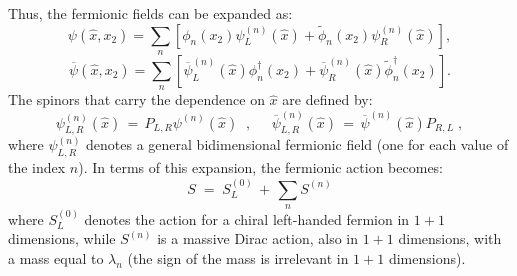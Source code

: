 \documentclass[a4paper,12pt]{article}
\begin{document}
{{Thus, the fermionic fields can be expanded as:
\begin{equation}
\psi (\hat x , x_2 ) = \sum_n [\phi_n(x_2) \psi_L^{(n)}(\hat x) +
\widetilde{\phi}_n(x_2) \psi_R^{(n)}(\hat x)] ,
\end{equation}
\begin{equation}
\overline{\psi} (\hat x , x_2 ) = \sum_n [\overline{\psi}_L^{(n)}(\hat x) \phi_n^{\dagger}(x_2)
+ \overline{\psi}_R^{(n)}(\hat x) \widetilde{\phi}_n^{\dagger}(x_2)] .
\end{equation}
The spinors that carry the dependence on $\hat x$ are defined by:
\begin{equation}
\psi_{L,R}^{(n)}(\hat x)\,=\,P_{L,R} \psi^{(n)}(\hat x)\;\;,\;\;\;\;\;
\overline{\psi}_{L,R}^{(n)}(\hat x)\,=\,\overline{\psi}^{(n)}(\hat x) P_{R,L}\;,
\end{equation}
where $\psi_{L,R}^{(n)}$ denotes a general bidimensional fermionic
field (one for each value of the index $n$). In terms of this
expansion, the fermionic action becomes:
\begin{equation}
   \label{eq:actexp}
S \;=\; S_L^{(0)} \,+\, \sum_n  S^{(n)}
\end{equation}
where $S_L^{(0)}$ denotes the action for a chiral left-handed fermion
in $1+1$ dimensions, while $S^{(n)}$ is a massive Dirac action, also
in $1+1$ dimensions, with a mass equal to $\lambda_n$ (the sign of the
mass is irrelevant in $1+1$ dimensions).

}}
\end{document}
